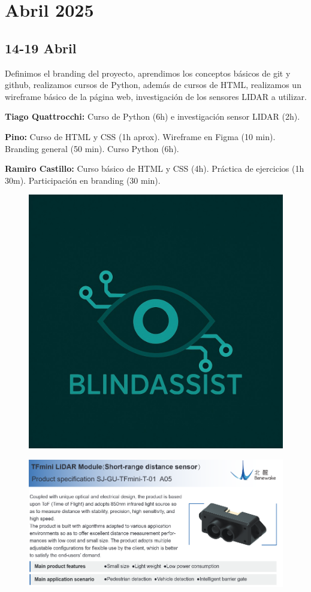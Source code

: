 \documentclass[12pt,a4paper]{article}
\begin{document}
\section*{Abril 2025}

\subsection*{14-19 Abril}
Definimos el branding del proyecto, aprendimos los conceptos básicos de git y github, realizamos cursos de Python, además de cursos de HTML, realizamos un wireframe básico de la página web, investigación de los sensores LIDAR a utilizar.

\textbf{Tiago Quattrocchi:} Curso de Python (6h) e investigación sensor LIDAR (2h).  

\textbf{Pino:} Curso de HTML y CSS (1h aprox). Wireframe en Figma (10 min). Branding general (50 min). Curso Python (6h).  

\textbf{Ramiro Castillo:} Curso básico de HTML y CSS (4h). Práctica de ejercicios (1h 30m). Participación en branding (30 min).

\begin{figure}[H]
    \centering
    \includegraphics[width=0.5\linewidth]{Carpeta de campo/logo.jpg}
    \label{fig:placeholder}
\end{figure}

\begin{figure}[H]
\centering
    \includegraphics[width=0.5\linewidth]{Carpeta de campo/Tfmini invest.png}
    \label{fig:placeholder}
\end{figure}
\end{document}

